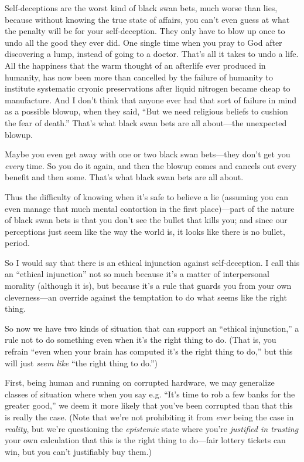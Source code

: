 {
 Self-deceptions are the worst kind of black swan bets, much worse
than lies, because without knowing the true state of affairs, you
can't even guess at what the penalty will be for your
self-deception. They only have to blow up once to undo all the good
they ever did. One single time when you pray to God after discovering a
lump, instead of going to a doctor. That's all it takes
to undo a life. All the happiness that the warm thought of an afterlife
ever produced in humanity, has now been more than cancelled by the
failure of humanity to institute systematic cryonic preservations after
liquid nitrogen became cheap to manufacture. And I
don't think that anyone ever had that sort of failure
in mind as a possible blowup, when they said, ``But we
need religious beliefs to cushion the fear of
death.'' That's what black swan bets
are all about---the unexpected blowup.}

{
 Maybe you even get away with one or two black swan bets---they
don't get you \textit{every} time. So you do it again,
and then the blowup comes and cancels out every benefit and then some.
That's what black swan bets are all about.}

{
 Thus the difficulty of knowing when it's safe to
believe a lie (assuming you can even manage that much mental contortion
in the first place)---part of the nature of black swan bets is that you
don't see the bullet that kills you; and since our
perceptions just seem like the way the world is, it looks like there is
no bullet, period.}

{
 So I would say that there is an ethical injunction against
self-deception. I call this an ``ethical
injunction'' not so much because it's
a matter of interpersonal morality (although it is), but because
it's a rule that guards you from your own
cleverness---an override against the temptation to do what seems like
the right thing.}

{
 So now we have two kinds of situation that can support an
``ethical injunction,'' a rule not
to do something even when it's the right thing to do.
(That is, you refrain ``even when your brain has
computed it's the right thing to
do,'' but this will just \textit{seem like}
``the right thing to do.'')}

{
 First, being human and running on corrupted hardware, we may
generalize classes of situation where when you say e.g.
``It's time to rob a few banks for the
greater good,'' we deem it more likely that
you've been corrupted than that this is really the
case. (Note that we're not prohibiting it from
\textit{ever} being the case in \textit{reality}, but
we're questioning the \textit{epistemic} state where
you're \textit{justified in trusting} your own
calculation that this is the right thing to do---fair lottery tickets
can win, but you can't justifiably buy them.)}

